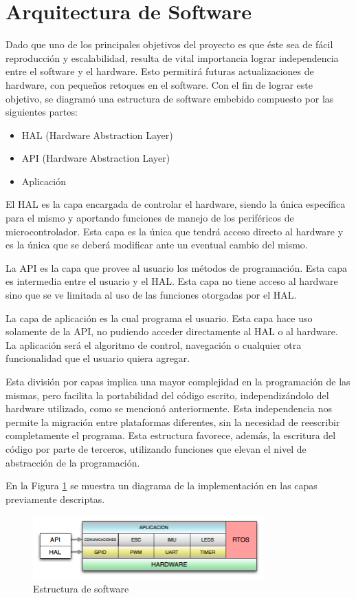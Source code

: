 \documentclass[a4paper, conference]{IEEEtran}
\begin{document}
\section{Arquitectura de Software}
Dado que uno de los principales objetivos del proyecto es que éste sea de fácil reproducción y escalabilidad, resulta de vital importancia lograr independencia entre el software y el hardware. Esto permitirá futuras actualizaciones de hardware, con pequeños retoques en el software. Con el fin de lograr este objetivo, se diagramó una estructura de software embebido compuesto por las siguientes partes:
\begin{itemize}
\item HAL (Hardware Abstraction Layer)
\item API  (Hardware Abstraction Layer)
\item Aplicación 
\end{itemize}

El HAL es la capa encargada de controlar el hardware, siendo la única específica para el mismo y aportando funciones de manejo de los periféricos de microcontrolador. Esta capa es la única que tendrá acceso directo al hardware y es la única que se deberá modificar ante un eventual cambio del mismo.

La API es la capa que provee al usuario los métodos de programación. Esta capa es intermedia entre el usuario y el HAL. Esta capa no tiene acceso al hardware sino que se ve limitada al uso de las funciones otorgadas por el HAL.

La capa de aplicación es la cual programa el usuario. Esta capa hace uso solamente de la API, no pudiendo acceder directamente al HAL o al hardware. La aplicación será el algoritmo de control, navegación o cualquier otra funcionalidad que el usuario quiera agregar.

Esta división por capas implica una mayor complejidad en la programación de las mismas, pero facilita la portabilidad del código escrito, independizándolo del hardware utilizado, como se mencionó anteriormente. Esta independencia nos permite la migración entre plataformas diferentes, sin la necesidad de reescribir completamente el programa. Esta estructura favorece, además, la escritura del código por parte de terceros, utilizando funciones que elevan el nivel de abstracción de la programación.

En la Figura \ref{ref:soft} se muestra un diagrama de la implementación en las capas previamente descriptas.

\begin{figure}[!t]
\centering
\includegraphics[width=3.49in]{soft}
\caption{Estructura de software}
\label{ref:soft}
\end{figure}
\end{document}
